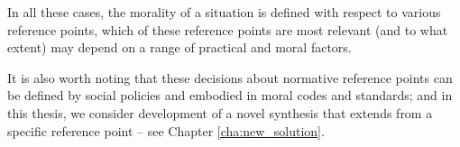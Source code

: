 
In all these cases, the morality of a situation is defined with respect to various reference points, which of these reference points are most relevant (and to what extent) may depend on a range of practical and moral factors.

It is also worth noting that these decisions about normative reference points can be defined by social policies %
 and embodied in moral codes and standards; and in this thesis, we consider development of a novel synthesis that extends from a specific reference point -- see Chapter \ref{cha:new_solution}. 





